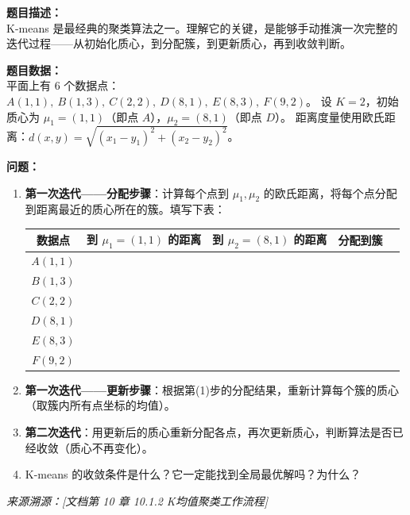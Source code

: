 \documentclass[a4paper,11pt]{ctexart}
\begin{document}
\begin{problembox}
    \textbf{题目描述：}\\
    K-means 是最经典的聚类算法之一。理解它的关键，是能够手动推演一次完整的迭代过程——从初始化质心，到分配簇，到更新质心，再到收敛判断。

    \vspace{0.3cm}
    \textbf{题目数据：}\\
    平面上有 6 个数据点：$A(1,1),\ B(1,3),\ C(2,2),\ D(8,1),\ E(8,3),\ F(9,2)$。
    设 $K=2$，初始质心为 $\mu_1 = (1,1)$（即点 $A$），$\mu_2 = (8,1)$（即点 $D$）。
    距离度量使用欧氏距离：$d(x, y) = \sqrt{(x_1-y_1)^2 + (x_2-y_2)^2}$。

    \vspace{0.2cm}
    \textbf{问题：}
    \begin{enumerate}[(1)]
        \item \textbf{第一次迭代——分配步骤}：计算每个点到 $\mu_1, \mu_2$ 的欧氏距离，将每个点分配到距离最近的质心所在的簇。填写下表：

        \begin{center}
        \begin{tabular}{ccccl}
            \toprule
            数据点 & 到 $\mu_1=(1,1)$ 的距离 & 到 $\mu_2=(8,1)$ 的距离 & 分配到簇 \\
            \midrule
            $A(1,1)$ & \underline{\quad} & \underline{\quad} & \underline{\quad} \\
            $B(1,3)$ & \underline{\quad} & \underline{\quad} & \underline{\quad} \\
            $C(2,2)$ & \underline{\quad} & \underline{\quad} & \underline{\quad} \\
            $D(8,1)$ & \underline{\quad} & \underline{\quad} & \underline{\quad} \\
            $E(8,3)$ & \underline{\quad} & \underline{\quad} & \underline{\quad} \\
            $F(9,2)$ & \underline{\quad} & \underline{\quad} & \underline{\quad} \\
            \bottomrule
        \end{tabular}
        \end{center}

        \item \textbf{第一次迭代——更新步骤}：根据第(1)步的分配结果，重新计算每个簇的质心（取簇内所有点坐标的均值）。

        \item \textbf{第二次迭代}：用更新后的质心重新分配各点，再次更新质心，判断算法是否已经收敛（质心不再变化）。

        \item K-means 的收敛条件是什么？它一定能找到全局最优解吗？为什么？
    \end{enumerate}

    \vspace{0.2cm}
    {\color{gray}\small\textit{来源溯源：[文档第 10 章 10.1.2 K均值聚类工作流程]}}
\end{problembox}
\end{document}
